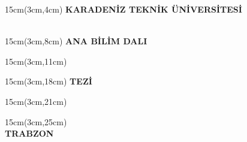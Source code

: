 \documentclass[a4paper,12pt]{article}
\begin{document}
\clearpage
\begin{center}
\begin{textblock*}{15cm}(3cm,4cm)
\textbf{KARADENİZ TEKNİK ÜNİVERSİTESİ}\\
\textbf{\INSTA}\\
\end{textblock*}

\begin{textblock*}{15cm}(3cm,8cm)
\textbf{\ABDA \space ANA BİLİM DALI}
\end{textblock*}

\begin{textblock*}{15cm}(3cm,11cm)
\textbf{\TURKISHTITLEA}
\end{textblock*}

\begin{textblock*}{15cm}(3cm,18cm)
\textbf{\DEGREE \space TEZİ}
\end{textblock*}

\begin{textblock*}{15cm}(3cm,21cm)
\textbf{\AUTHORNAME}
\end{textblock*}

\begin{textblock*}{15cm}(3cm,25cm)
\textbf{\THESISMONTH \space \THESISYEAR\\
TRABZON}
\end{textblock*}

\end{center}



\end{document}

